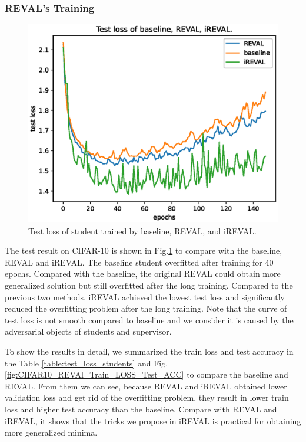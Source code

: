 \documentclass[english]{sobraep}
\begin{document}
\subsubsection{REVAL's Training}
\begin{figure}
    \centering
    \captionsetup{justification=centering,margin=2cm}
    \includegraphics[scale=0.5]{Figures/CIFAR10/test_loss.eps}
    \caption{Test loss of student trained by baseline, REVAL, and iREVAL.}
    \label{fig:test_loss_student}
\end{figure}

The test result on CIFAR-10 is shown in Fig.\ref{fig:test_loss_student} to compare with the baseline, REVAL and iREVAL. The baseline student overfitted after training for 40 epochs. Compared with the baseline, the original REVAL could obtain more generalized solution but still overfitted after the long training. Compared to the previous two methods, iREVAL achieved the lowest test loss and significantly reduced the overfitting problem after the long training. Note that the curve of test loss is not smooth compared to baseline and we consider it is caused by the adversarial objects of students and supervisor.

To show the results in detail, we summarized the train loss and test  accuracy in the Table \ref{table:test_loss_students} and Fig.\ref{fig:CIFAR10_REVAl_Train_LOSS_Test_ACC} to compare the baseline and REVAL. From them we can see, because REVAL and iREVAL obtained lower validation loss and get rid of the overfitting problem, they result in lower train loss and higher test accuracy than the baseline. Compare with REVAL and iREVAL, it shows that the tricks we propose in iREVAL is practical for obtaining more generalized minima.
\end{document}
